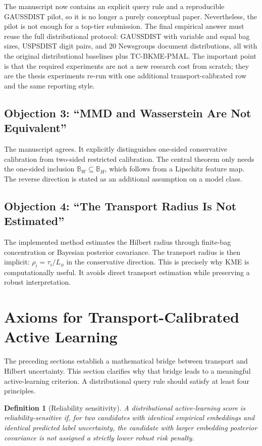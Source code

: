 \documentclass[10pt,journal]{IEEEtran}
\newtheorem{definition}{Definition}
\newcommand{\ball}{\mathbb{B}}
\begin{document}
The manuscript now contains an explicit query rule and a reproducible GAUSSDIST pilot, so it is no longer a purely conceptual paper. Nevertheless, the pilot is not enough for a top-tier submission. The final empirical answer must reuse the full distributional protocol: GAUSSDIST with variable and equal bag sizes, USPSDIST digit pairs, and 20 Newsgroups document distributions, all with the original distributional baselines plus TC-BKME-PMAL. The important point is that the required experiments are not a new research cost from scratch; they are the thesis experiments re-run with one additional transport-calibrated row and the same reporting style.

\subsection{Objection 3: ``MMD and Wasserstein Are Not Equivalent''}

The manuscript agrees. It explicitly distinguishes one-sided conservative calibration from two-sided restricted calibration. The central theorem only needs the one-sided inclusion $\ball_W\subseteq\ball_H$, which follows from a Lipschitz feature map. The reverse direction is stated as an additional assumption on a model class.

\subsection{Objection 4: ``The Transport Radius Is Not Estimated''}

The implemented method estimates the Hilbert radius through finite-bag concentration or Bayesian posterior covariance. The transport radius is then implicit: $\rho_i=\tau_i/L_\phi$ in the conservative direction. This is precisely why KME is computationally useful. It avoids direct transport estimation while preserving a robust interpretation.


\section{Axioms for Transport-Calibrated Active Learning}
\label{sec:axioms}

The preceding sections establish a mathematical bridge between transport and Hilbert uncertainty. This section clarifies why that bridge leads to a meaningful active-learning criterion. A distributional query rule should satisfy at least four principles.

\begin{definition}[Reliability sensitivity]
A distributional active-learning score is reliability-sensitive if, for two candidates with identical empirical embeddings and identical predicted label uncertainty, the candidate with larger embedding posterior covariance is not assigned a strictly lower robust risk penalty.
\end{definition}
\end{document}
